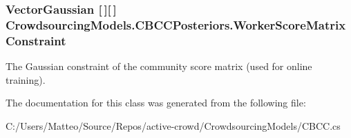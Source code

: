 \hypertarget{class_crowdsourcing_models_1_1_c_b_c_c_posteriors_a28a4852598eb85d4bc635c247d761f2b}{}
\subsubsection[{Worker\+Score\+Matrix\+Constraint}]{\setlength{\rightskip}{0pt plus 5cm}Vector\+Gaussian \mbox{[}$\,$\mbox{]}\mbox{[}$\,$\mbox{]} Crowdsourcing\+Models.\+C\+B\+C\+C\+Posteriors.\+Worker\+Score\+Matrix\+Constraint}\label{class_crowdsourcing_models_1_1_c_b_c_c_posteriors_a28a4852598eb85d4bc635c247d761f2b}


The Gaussian constraint of the community score matrix (used for online training). 



The documentation for this class was generated from the following file\+:\begin{DoxyCompactItemize}
\item 
C\+:/\+Users/\+Matteo/\+Source/\+Repos/active-\/crowd/\+Crowdsourcing\+Models/C\+B\+C\+C.\+cs\end{DoxyCompactItemize}
